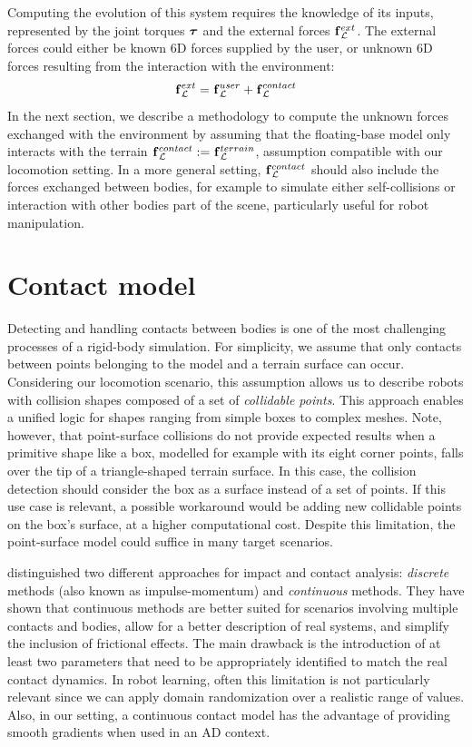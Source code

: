 Computing the evolution of this system requires the knowledge of its inputs, represented by the joint torques $\boldsymbol{\tau}$ and the external forces $\prescript{}{}{\mathbf{f}}_{\mathcal{L}}^{ext}$.
The external forces could either be known 6D forces supplied by the user, or unknown 6D forces resulting from the interaction with the environment:
%
\begin{equation}
    \label{eq:decomposition_external_forces}
    \prescript{}{}{\mathbf{f}}_\mathcal{L}^{ext} = \prescript{}{}{\mathbf{f}}_\mathcal{L}^{user} + \prescript{}{}{\mathbf{f}}_\mathcal{L}^{contact}
\end{equation}
%
In the next section, we describe a methodology to compute the unknown forces exchanged with the environment by assuming that the floating-base model only interacts with the terrain $\prescript{}{}{\mathbf{f}}_\mathcal{L}^{contact} := \prescript{}{}{\mathbf{f}}_\mathcal{L}^{terrain}$, assumption compatible with our locomotion setting.
In a more general setting, $\prescript{}{}{\mathbf{f}}_\mathcal{L}^{contact}$ should also include the forces exchanged between bodies, for example to simulate either self-collisions or interaction with other bodies part of the scene, particularly useful for robot manipulation.

\newpage
\section{Contact model}
\label{section:contact_model}

Detecting and handling contacts between bodies is one of the most challenging processes of a rigid-body simulation.
For simplicity, we assume that only contacts between points belonging to the model and a terrain surface can occur.
Considering our locomotion scenario, this assumption allows us to describe robots with collision shapes composed of a set of \emph{collidable points}.
This approach enables a unified logic for shapes ranging from simple boxes to complex meshes.
Note, however, that point-surface collisions do not provide expected results when a primitive shape like a box, modelled for example with its eight corner points, falls over the tip of a triangle-shaped terrain surface.
In this case, the collision detection should consider the box as a surface instead of a set of points.
If this use case is relevant, a possible workaround would be adding new collidable points on the box's surface, at a higher computational cost.
Despite this limitation, the point-surface model could suffice in many target scenarios.

\textcite{gilardi_literature_2002} distinguished two different approaches for impact and contact analysis: \emph{discrete} methods (also known as impulse-momentum) and \emph{continuous} methods.
They have shown that continuous methods are better suited for scenarios involving multiple contacts and bodies, allow for a better description of real systems, and simplify the inclusion of frictional effects.
The main drawback is the introduction of at least two parameters that need to be appropriately identified to match the real contact dynamics.
In robot learning, often this limitation is not particularly relevant since we can apply domain randomization over a realistic range of values.
Also, in our setting, a continuous contact model has the advantage of providing smooth gradients when used in an \ac{AD} context.

